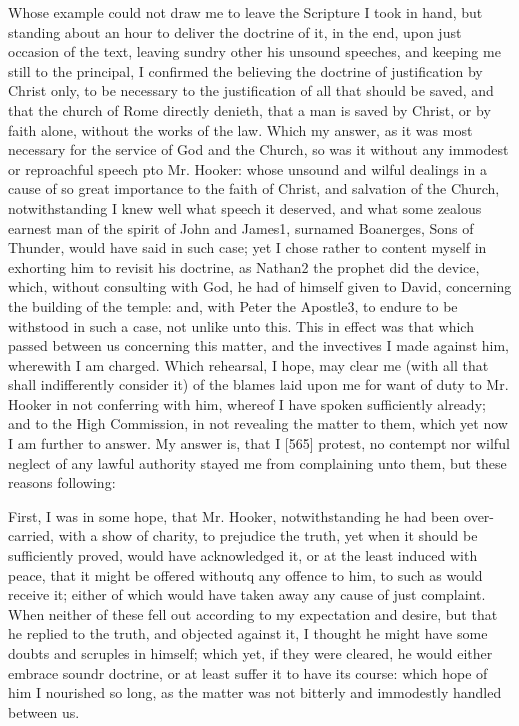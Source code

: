 Whose example could not draw me to leave the Scripture I took in hand, but standing about an hour to deliver the doctrine of it, in the end, upon just occasion of the text, leaving sundry other his unsound speeches, and keeping me still to the principal, I confirmed the believing the doctrine of justification by Christ only, to be necessary to the justification of all that should be saved, and that the church of Rome directly denieth, that a man is saved by Christ, or by faith alone, without the works of the law. Which my answer, as it was most necessary for the service of God and the Church, so was it without any immodest or reproachful speech pto Mr. Hooker: whose unsound and wilful dealings in a cause of so great importance to the faith of Christ, and salvation of the Church, notwithstanding I knew well what speech it deserved, and what some zealous earnest man of the spirit of John and James1, surnamed Boanerges, Sons of Thunder, would have said in such case; yet I chose rather to content myself in exhorting him to revisit his doctrine, as Nathan2 the prophet did the device, which, without consulting with God, he had of himself given to David, concerning the building of the temple: and, with Peter the Apostle3, to endure to be withstood in such a case, not unlike unto this. This in effect was that which passed between us concerning this matter, and the invectives I made against him, wherewith I am charged. Which rehearsal, I hope, may clear me (with all that shall indifferently consider it) of the blames laid upon me for want of duty to Mr. Hooker in not conferring with him, whereof I have spoken sufficiently already; and to the High Commission, in not revealing the matter to them, which yet now I am further to answer. My answer is, that I [565] protest, no contempt nor wilful neglect of any lawful authority stayed me from complaining unto them, but these reasons following:

First, I was in some hope, that Mr. Hooker, notwithstanding he had been over-carried, with a show of charity, to prejudice the truth, yet when it should be sufficiently proved, would have acknowledged it, or at the least induced with peace, that it might be offered withoutq any offence to him, to such as would receive it; either of which would have taken away any cause of just complaint. When neither of these fell out according to my expectation and desire, but that he replied to the truth, and objected against it, I thought he might have some doubts and scruples in himself; which yet, if they were cleared, he would either embrace soundr doctrine, or at least suffer it to have its course: which hope of him I nourished so long, as the matter was not bitterly and immodestly handled between us.

